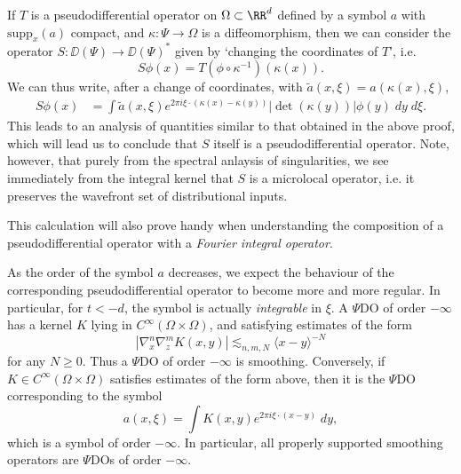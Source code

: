 \begin{remark}
    If $T$ is a pseudodifferential operator on $\Omega \subset \RR^d$ defined by a symbol $a$ with $\text{supp}_x(a)$ compact, and $\kappa: \Psi \to \Omega$ is a diffeomorphism, then we can consider the operator $S: \DD(\Psi) \to \DD(\Psi)^*$ given by `changing the coordinates of $T$', i.e.
    \[ S\phi(x) = T(\phi \circ \kappa^{-1})(\kappa(x)). \]
    We can thus write, after a change of coordinates, with $\tilde{a}(x,\xi) = a(\kappa(x),\xi)$,
    \begin{align*}
        S\phi(x) &= \int \tilde{a}(x,\xi) e^{2 \pi i \xi \cdot (\kappa(x) - \kappa(y))} |\det(\kappa(y))| \phi(y)\; dy\; d\xi.
    \end{align*}
    This leads to an analysis of quantities similar to that obtained in the above proof, which will lead us to conclude that $S$ itself is a pseudodifferential operator. Note, however, that purely from the spectral anlaysis of singularities, we see immediately from the integral kernel that $S$ is a microlocal operator, i.e. it preserves the wavefront set of distributional inputs.

    This calculation will also prove handy when understanding the composition of a pseudodifferential operator with a \emph{Fourier integral operator}.
\end{remark}

As the order of the symbol $a$ decreases, we expect the behaviour of the corresponding pseudodifferential operator to become more and more regular. In particular, for $t < - d$, the symbol is actually \emph{integrable} in $\xi$. A $\Psi$DO of order $-\infty$ has a kernel $K$ lying in $C^\infty(\Omega \times \Omega)$, and satisfying estimates of the form
%
\[ | \nabla^n_x \nabla^m_z K(x,y)| \lesssim_{n,m,N} \langle x-y \rangle^{-N} \]
%
for any $N \geq 0$. Thus a $\Psi$DO of order $-\infty$ is smoothing. Conversely, if $K \in C^\infty(\Omega \times \Omega)$ satisfies estimates of the form above, then it is the $\Psi$DO corresponding to the symbol
%
\[ a(x,\xi) = \int K(x,y) e^{2 \pi i \xi \cdot (x-y)}\; dy, \]
%
which is a symbol of order $-\infty$. In particular, all properly supported smoothing operators are $\Psi$DOs of order $-\infty$.

